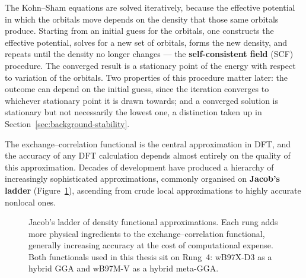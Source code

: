 The Kohn--Sham equations are solved iteratively, because the effective potential
in which the orbitals move depends on the density that those same orbitals
produce. Starting from an initial guess for the orbitals, one constructs the
effective potential, solves for a new set of orbitals, forms the new density, and
repeats until the density no longer changes --- the \textbf{self-consistent
field} (SCF) procedure. The converged result is a stationary point of the energy
with respect to variation of the orbitals. Two properties of this procedure
matter later: the outcome can depend on the initial guess, since the iteration
converges to whichever stationary point it is drawn towards; and a converged
solution is stationary but not necessarily the lowest one, a distinction taken up
in Section~\ref{sec:background-stability}.

The exchange--correlation functional is the central approximation in DFT, and
the accuracy of any DFT calculation depends almost entirely on the quality of
this approximation. Decades of development have produced a hierarchy of increasingly
sophisticated approximations, commonly organised on \textbf{Jacob's ladder}
(Figure~\ref{fig:jacobs-ladder}), ascending from crude local approximations to
highly accurate nonlocal ones.

\begin{figure}[h]
\centering
{}
\caption{Jacob's ladder of density functional approximations. Each rung adds
more physical ingredients to the exchange--correlation functional, generally
increasing accuracy at the cost of computational expense. Both functionals used
in this thesis sit on Rung~4: \mbox{wB97X-D3} as a hybrid GGA and \mbox{wB97M-V}
as a hybrid meta-GGA.}
\label{fig:jacobs-ladder}
\end{figure}


